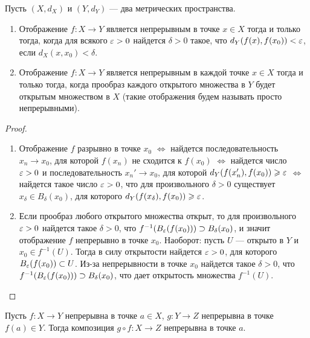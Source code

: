 \documentclass[a4paper]{article}
\theoremstyle{named}
\begin{document}
    \begin{lemma*}
        Пусть $(X, d_X)$ и $(Y, d_Y)$ --- два метрических пространства.
        \begin{enumerate}
        \item
            Отображение $f: X \to Y$ является непрерывным в точке $x \in X$ тогда и только тогда, когда для всякого $\varepsilon > 0$ найдется $\delta > 0$ такое, что $d_Y(f(x), f(x_0)) < \varepsilon$, если $d_X(x, x_0) < \delta$.

        \item
            Отображение $f: X \to Y$ является непрерывным в каждой точке $x \in X$ тогда и только тогда, когда прообраз каждого открытого множества в $Y$ будет открытым множеством в $X$ (такие отображения будем называть просто непрерывными).
        \end{enumerate}
    \end{lemma*}

    \begin{proof}
        ~

        \begin{enumerate}
        \item
            Отображение $f$ разрывно в точке $x_0$ $\iff$ найдется последовательность $x_n \to x_0$, для которой $f(x_n)$ не сходится к $f(x_0)$ $\iff$ найдется число $\varepsilon > 0$ и последовательность $x_n' \to x_0$, для которой $d_Y(f(x_n'), f(x_0)) \geqslant \varepsilon$ $\iff$ найдется такое число $\varepsilon > 0$, что для произвольного $\delta > 0$ существует $x_{\delta} \in B_{\delta}(x_0)$, для которого $d_Y(f(x_\delta), f(x_0)) \geqslant \varepsilon$.

        \item
            Если прообраз любого открытого множества открыт, то для произвольного $\varepsilon > 0$ найдется такое $\delta > 0$, что $f^{-1}(B_{\varepsilon}(f(x_0))) \supset B_{\delta}(x_0)$, и значит отображение $f$ непрерывно в точке $x_0$. Наоборот: пусть $U$ --- открыто в $Y$ и $x_0 \in f^{-1}(U)$. Тогда в силу открытости найдется $\varepsilon > 0$, для которого $B_{\varepsilon}(f(x_0)) \subset U$. Из-за непрерывности в точке $x_0$ найдется такое $\delta > 0$, что $f^{-1}(B_{\varepsilon}(f(x_0))) \supset B_{\delta}(x_0)$, что дает открытость множества $f^{-1}(U)$.
        \end{enumerate} 
    \end{proof}

    \begin{proposal*}
        Пусть $f: X \to Y$ непрерывна в точке $a \in X$, $g: Y \to Z$ непрерывна в точке $f(a) \in Y$. Тогда композиция $g \circ f: X \to Z$ непрерывна в точке $a$.
    \end{proposal*}
\end{document}
